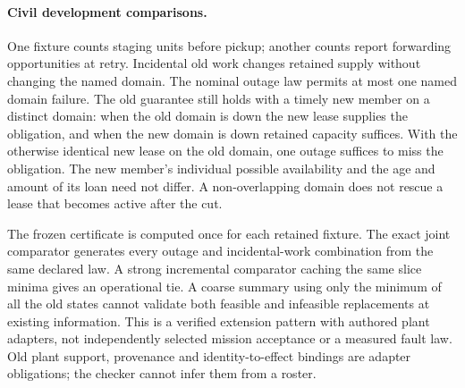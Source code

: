\documentclass{article}
\begin{document}
\paragraph{Civil development comparisons.}
One fixture counts staging units before pickup; another counts report
forwarding opportunities at retry. Incidental old work changes retained
supply without changing the named domain. The nominal outage law permits
at most one named domain failure. The old guarantee still holds with a
timely new member on a distinct domain: when the old domain is down the
new lease supplies the obligation, and when the new domain is down retained
capacity suffices. With the otherwise identical new lease on the old
domain, one outage suffices to miss the obligation. The new member's
individual possible availability and the age and amount of its loan
need not differ. A non-overlapping domain does not rescue a lease that
becomes active after the cut.

The frozen certificate is computed once for each retained fixture.
The exact joint comparator generates every outage and incidental-work
combination from the same declared law. A strong incremental comparator
caching the same slice minima gives an operational tie. A coarse summary
using only the minimum of all the old states cannot validate both feasible
and infeasible replacements at existing information. This is a verified
extension pattern with authored plant adapters, not independently selected
mission acceptance or a measured fault law. Old plant support, provenance
and identity-to-effect bindings are adapter obligations; the checker cannot
infer them from a roster.
\end{document}
